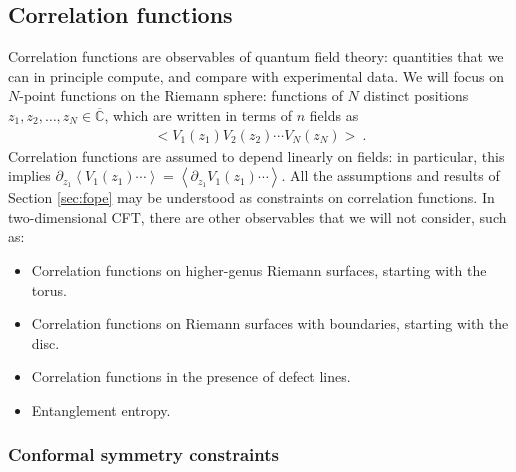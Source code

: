 \documentclass[12pt, a4paper]{article}
\theoremstyle{break}
\begin{document}
\subsection{Correlation functions}\label{sec:cor}

Correlation functions are observables of quantum field theory: quantities that we can in principle compute, and compare with experimental data. We will focus on $N$-point functions on the Riemann sphere: functions of $N$ distinct positions $z_1,z_2,\dots, z_N\in \overline{\mathbb{C}}$, which are written in terms of $n$ fields as 
\begin{align}
 \Big< V_1(z_1) V_2(z_2) \cdots V_N(z_N)\Big>\ . 
\end{align}
Correlation functions are assumed to depend linearly on fields: in particular, this implies $\partial_{z_1}\left<  V_1(z_1) \cdots \right> = \left< \partial_{z_1} V_1(z_1) \cdots \right>$.
All the assumptions and results of Section \ref{sec:fope} may be understood as constraints on correlation functions. 
In two-dimensional CFT, there are other observables that we will not consider, such as: 
\begin{itemize}
 \item Correlation functions on higher-genus Riemann surfaces, starting with the torus. 
 \item Correlation functions on Riemann surfaces with boundaries, starting with the disc. 
 \item Correlation functions in the presence of defect lines. 
 \item Entanglement entropy. 
\end{itemize}

\subsubsection{Conformal symmetry constraints}\label{sec:csc}
\end{document}
